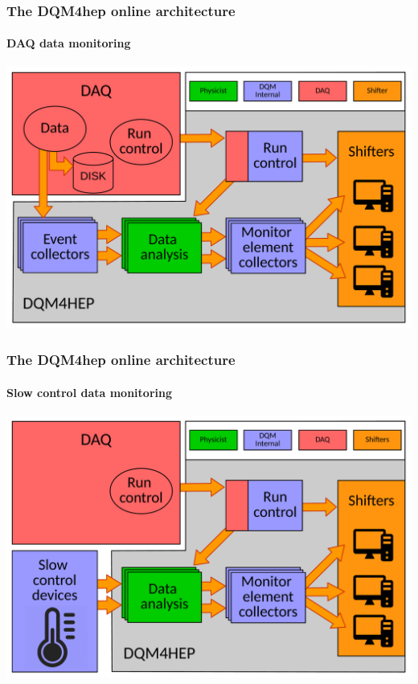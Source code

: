 \documentclass[presentation, 10pt]{beamer}
\begin{document}
\begin{frame}
  \frametitle{The DQM4hep online architecture}
  \framesubtitle{DAQ data monitoring}
  \includegraphics[width=0.95\linewidth]{figs/AnalysisModuleArchitecture.pdf}
\end{frame}

\begin{frame}
  \frametitle{The DQM4hep online architecture}
  \framesubtitle{Slow control data monitoring}
  \includegraphics[width=0.95\linewidth]{figs/StandaloneModuleArchitecture.pdf}
\end{frame}
\end{document}
